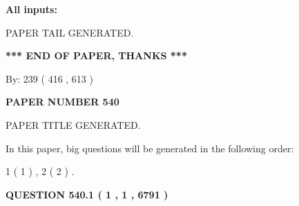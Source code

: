 \documentclass{ctexart}
\begin{document}
   
   
   
\noindent{}
   
   
   
   
\noindent\vspace{0.1in}\hspace{-0.08in} {\textbf{\Large{All inputs: }}}
   
   
   
   
   
   
 \vspace{0.2in}
 
   
   
\vspace{2.0in} PAPER TAIL GENERATED.
   
   
   
   
\vspace{1.0in} 
{\textbf{\large{ *** END OF PAPER, THANKS *** }}} 
   
   
\hspace{1.0in} By: 
 239 ( 416 ,  613 )
   
   
   
   
\newpage 
\setcounter{page}{ 
   540001 } 
   
   
   
   
 {\textbf{ \Large{ PAPER NUMBER  540  }}}
   
   
\vspace{0.2in}
   
   
   
   
   
   
   
   
 \vspace{0.2in}
 
 
 
 
   
   
 PAPER TITLE GENERATED.
   
   
   
\vspace{0.2in}
   
In this paper, big questions will be generated in the following order: 
   
   
   1 ( 1 )
 ,
   2 ( 2 )
 .
  
\vspace{0.2in}
  
{\textbf{\Large{QUESTION
540.1 
 ( 1 , 1 , 6791 )
}}}
  
\end{document}
